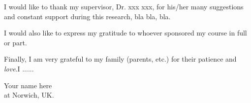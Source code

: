
\def\baselinestretch{1.0}


I would like to thank my supervisor, Dr. xxx xxx, for his/her
many suggestions and constant support during this research, bla
bla, bla.

\noindent
I would also like to express my gratitude to whoever
sponsored my course in full or part.

\medskip

\noindent
Finally, I am very grateful to my family (parents,
etc.) for their patience and {\em love}.I ......

\bigskip\medskip

\noindent
\hfill Your name here \\
\hfill at Norwich, UK.\\

